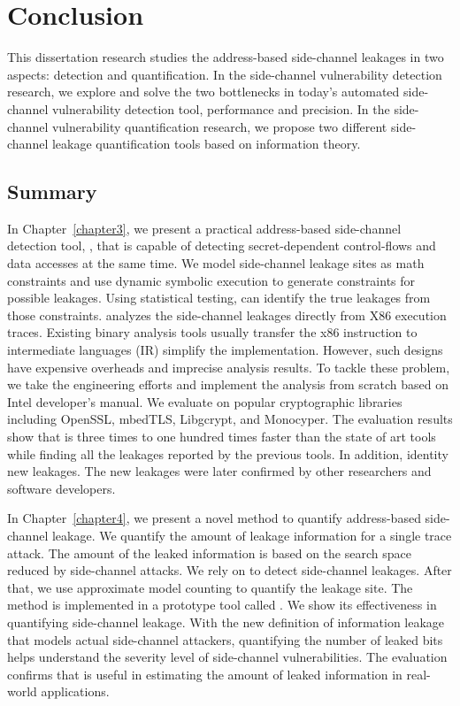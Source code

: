 \chapter{Conclusion}\label{chapter6}
This dissertation research studies the address-based side-channel leakages in two aspects: detection and quantification. In the side-channel vulnerability detection research, we explore and solve the two bottlenecks in today's automated side-channel vulnerability detection tool, performance and precision. In the side-channel vulnerability quantification research, we propose two different side-channel leakage quantification tools based on information theory. 

\section{Summary}

In Chapter~\ref{chapter3}, we present a practical address-based side-channel detection tool, \detect{}, that is capable of detecting secret-dependent control-flows and data accesses at the same time. We model side-channel leakage sites as math constraints and use dynamic symbolic execution to generate constraints for possible leakages. Using statistical testing, \detect{} can identify the true leakages from those constraints. \detect{} analyzes the side-channel leakages directly from X86 execution traces. Existing binary analysis tools usually transfer the x86 instruction to intermediate languages (IR) simplify the implementation. However, such designs have expensive overheads and imprecise analysis results. To tackle these problem, we take the engineering efforts and implement the analysis from scratch  based on Intel developer's manual. We evaluate \detect{} on popular cryptographic libraries including OpenSSL, mbedTLS, Libgcrypt, and Monocyper. The evaluation results show that \detect{} is three times to one hundred times faster than the state of art tools while finding all the leakages reported by the previous tools. In addition, \detect{} identity new leakages. The new leakages were later confirmed by other researchers and software developers.  

In Chapter~\ref{chapter4}, we present a novel method to quantify address-based side-channel leakage. We quantify the amount of leakage information for a single trace attack. The amount of the leaked information is based on the search space reduced by side-channel attacks. We rely on \detect{} to detect side-channel leakages. After that, we use approximate model counting to quantify the leakage site. The method is implemented in a prototype tool called \tool{}. We show its effectiveness in quantifying side-channel leakage. With the new definition of information leakage that models actual side-channel attackers, quantifying the number of leaked bits helps understand the severity level of side-channel vulnerabilities. The evaluation confirms that \tool{} is useful in estimating the amount of leaked information in real-world applications.

